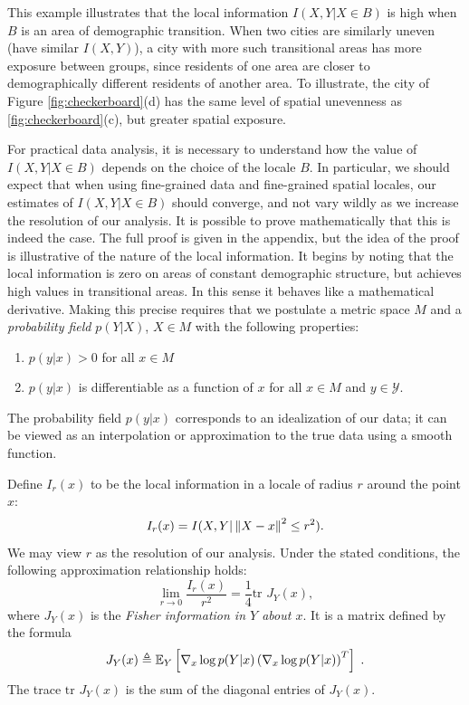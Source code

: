 \documentclass[english]{scrartcl}
\begin{document}
		This example illustrates that the local information $I(X,Y|X\in B)$ is high when $B$ is an area of demographic transition. When two cities are similarly uneven (have similar $I(X,Y)$), a city with more such transitional areas has more exposure between groups, since residents of one area are closer to demographically different residents of another area. To illustrate, the city of Figure \ref{fig:checkerboard}(d) has the same level of spatial unevenness as \ref{fig:checkerboard}(c), but greater spatial exposure. 

		For practical data analysis, it is necessary to understand how the value of $I(X,Y|X \in B)$ depends on the choice of the locale $B$. In particular, we should expect that when using fine-grained data and fine-grained spatial locales, our estimates of $I(X,Y|X \in B)$ should converge, and not vary wildly as we increase the resolution of our analysis. It is possible to prove mathematically that this is indeed the case. The full proof is given in the appendix, but the idea of the proof is illustrative of the nature of the local information. It begins by noting that the local information is zero on areas of constant demographic structure, but achieves high values in transitional areas. In this sense it behaves like a mathematical derivative. Making this precise requires that we postulate a metric space $M$ and a \emph{probability field} $p(Y|X)$, $X \in M$ with the following properties: 
		\begin{enumerate}
		 	\item $p(y|x) > 0$ for all $x \in M$
		 	\item $p(y|x)$ is differentiable as a function of $x$ for all $x \in M$ and $y \in \mathcal{Y}$. 
		\end{enumerate}
		The probability field $p(y|x)$ corresponds to an idealization of our data; it can be viewed as an interpolation or approximation to the true data using a smooth function. 

		Define $I_r(x)$ to be the local information in a locale of radius $r$ around the point $x$:
		\begin{equation*}
			I_r(x) = I(X,Y| \left\lVert X - x\right\rVert^2 \leq r^2). 
		\end{equation*}
		We may view $r$ as the resolution of our analysis. Under the stated conditions, the following approximation relationship holds: 
		\begin{equation}
			\lim_{r \rightarrow 0} \frac{I_r(x)}{r^2} = \frac{1}{4} \text{tr } J_Y(x), \label{eq:fisher_approx}
		\end{equation}
		where $J_Y(x)$ is the \emph{Fisher information in $Y$ about $x$}. It is a matrix defined by the formula
		\begin{equation*}
			J_Y(x) \triangleq \mathbb{E}_Y\left[\nabla_x \log p(Y|x) \left(\nabla_x \log p(Y|x)\right)^T \right]\;. 
		\end{equation*}
		The trace $\text{tr }J_Y(x)$ is the sum of the diagonal entries of $J_Y(x)$. 
\end{document}
